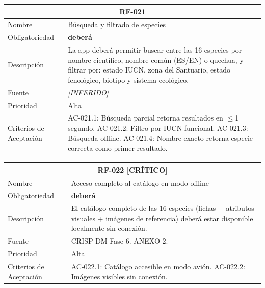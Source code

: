 \documentclass[12pt, a4paper]{article}
\newcommand{\criticomark}{\textcolor{criticolor}{\textbf{[CR\'ITICO]}}}
\newcommand{\inferido}{\textcolor{medio}{\textit{[INFERIDO]}}}
\begin{document}
\begin{longtable}{|p{3cm}|p{11.5cm}|}
\hline
\multicolumn{2}{|c|}{\textbf{RF-021}} \\
\hline
Nombre & B\'usqueda y filtrado de especies \\
\hline
Obligatoriedad & \textbf{deber\'a} \\
\hline
Descripci\'on & La app deber\'a permitir buscar entre las 16 especies por nombre cient\'ifico, nombre com\'un (ES/EN) o quechua, y filtrar por: estado IUCN, zona del Santuario, estado fenol\'ogico, biotipo y sistema ecol\'ogico. \\
\hline
Fuente & \inferido{} \\
\hline
Prioridad & Alta \\
\hline
Criterios de Aceptaci\'on &
AC-021.1: B\'usqueda parcial retorna resultados en $\leq$1 segundo. \newline
AC-021.2: Filtro por IUCN funcional. \newline
AC-021.3: B\'usqueda offline. \newline
AC-021.4: Nombre exacto retorna especie correcta como primer resultado. \\
\hline
\end{longtable}

\begin{longtable}{|p{3cm}|p{11.5cm}|}
\hline
\multicolumn{2}{|c|}{\textbf{RF-022} \criticomark} \\
\hline
Nombre & Acceso completo al cat\'alogo en modo offline \\
\hline
Obligatoriedad & \textbf{deber\'a} \\
\hline
Descripci\'on & El cat\'alogo completo de las 16 especies (fichas + atributos visuales + im\'agenes de referencia) deber\'a estar disponible localmente sin conexi\'on. \\
\hline
Fuente & CRISP-DM Fase 6. ANEXO 2. \\
\hline
Prioridad & Alta \\
\hline
Criterios de Aceptaci\'on &
AC-022.1: Cat\'alogo accesible en modo avi\'on. \newline
AC-022.2: Im\'agenes visibles sin conexi\'on. \\
\hline
\end{longtable}
\end{document}
